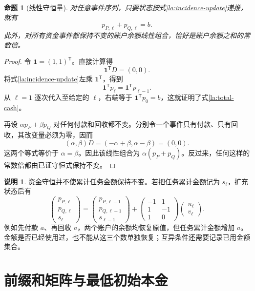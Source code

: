 \documentclass[UTF8,a4paper]{ctexbook}
\newtheorem{proposition}[theorem]{命题}
\theoremstyle{definition}
\newtheorem{remark}[theorem]{说明}
\numberwithin{equation}{chapter}
\newcommand{\1}{\mathbf{1}}
\begin{document}
\begin{proposition}[线性守恒量]\label{la:conservation}
对任意事件序列，只要状态按式\eqref{la:incidence-update}递推，就有
\begin{equation}\label{la:total-cash}
p_{P,\ell}+p_{Q,\ell}=b.
\end{equation}
此外，对所有资金事件都保持不变的账户余额线性组合，恰好是账户余额之和的常数倍。
\end{proposition}

\begin{proof}
令 $\boldsymbol{1}=(1,1)^{\mathsf T}$。直接计算得
\[
\boldsymbol{1}^{\mathsf T}D=(0,0).
\]
将式\eqref{la:incidence-update}左乘 $\boldsymbol{1}^{\mathsf T}$，得到
\[
\boldsymbol{1}^{\mathsf T}p_\ell
=\boldsymbol{1}^{\mathsf T}p_{\ell-1}.
\]
从 $\ell=1$ 逐次代入至给定的 $\ell$，右端等于 $\boldsymbol{1}^{\mathsf T}p_0=b$，这就证明了式\eqref{la:total-cash}。

再设 $\alpha p_P+\beta p_Q$ 对任何付款和回收都不变。分别令一个事件只有付款、只有回收，其改变量必须为零，因而
\[
(\alpha,\beta)D=(-\alpha+\beta,\alpha-\beta)=(0,0).
\]
这两个等式等价于 $\alpha=\beta$。因此该线性组合为 $\alpha(p_P+p_Q)$。反过来，任何这样的常数倍都由已证守恒式保持不变。
\end{proof}

\begin{remark}\label{la:cash-vs-task}
资金守恒并不使累计任务金额保持不变。若把任务累计金额记为 $s_\ell$，扩充状态后有
\[
\begin{pmatrix}p_{P,\ell}\\p_{Q,\ell}\\s_\ell\end{pmatrix}
=
\begin{pmatrix}p_{P,\ell-1}\\p_{Q,\ell-1}\\s_{\ell-1}\end{pmatrix}
+
\begin{pmatrix}-1&1\\1&-1\\1&0\end{pmatrix}
\begin{pmatrix}u_\ell\\v_\ell\end{pmatrix}.
\]
例如先付款 $a$、再回收 $a$，两个账户的余额均恢复原值，但任务累计金额增加 $a$。金额是否已经使用过，也不能从这三个数单独恢复；互异条件还需要记录已用金额集合。
\end{remark}

\section{前缀和矩阵与最低初始本金}
\end{document}
